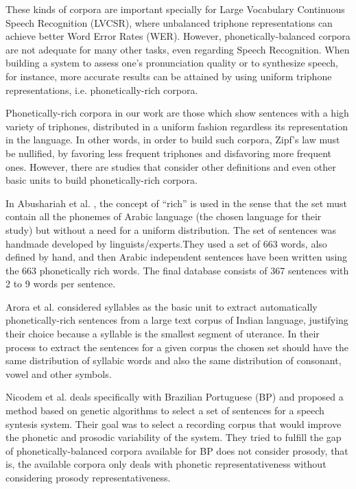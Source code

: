 These kinds of corpora are important specially for Large Vocabulary Continuous Speech 
Recognition (LVCSR), where unbalanced triphone representations can achieve better Word Error 
Rates (WER). However, phonetically-balanced corpora are not adequate for many other tasks, 
even regarding Speech Recognition. When building a system  to assess one's pronunciation 
quality or to synthesize speech, for instance, more accurate results can be attained by 
using uniform triphone representations, i.e. phonetically-rich corpora. 

Phonetically-rich corpora in our work are those which show sentences with a high variety of 
triphones, distributed in a uniform fashion regardless its representation in the language. 
In other words, in order to build such corpora, Zipf's law must be nullified, by favoring 
less frequent triphones and disfavoring more frequent ones. However, there are studies that 
consider other definitions and even other basic units to build phonetically-rich corpora.

In Abushariah et al. \cite{Abushariah2012}, the concept of ``rich'' is used in the sense that the set must 
contain all the phonemes of Arabic language (the chosen language for their study) 
but without a need for a uniform distribution. The set of sentences was handmade 
developed by linguists/experts.They used a set of 663 words, also defined  by hand, 
and then Arabic independent sentences have been written using the 663 phonetically 
rich words. The final database consists of 367 sentences with 2 to 9 words per sentence.

Arora et al.\cite{Arora2004} considered syllables as the basic unit to extract automatically 
phonetically-rich sentences from a large text corpus of Indian language, 
justifying their choice because a syllable is the smallest segment of uterance. 
In their process to extract the sentences for a given corpus the chosen set 
should have the same distribution of syllabic words and also the same distribution 
of consonant, vowel and other symbols.

Nicodem et al.\cite{Nicodem2007} deals specifically with Brazilian Portuguese (BP) 
and proposed a method based on genetic algorithms to select a set of sentences 
for a speech syntesis system. Their goal was to select a recording corpus that would 
improve the phonetic and prosodic variability of the system. They tried to fulfill the 
gap of phonetically-balanced corpora available for BP does not consider prosody, that is, 
the available corpora only deals with phonetic representativeness without considering 
prosody representativeness.

